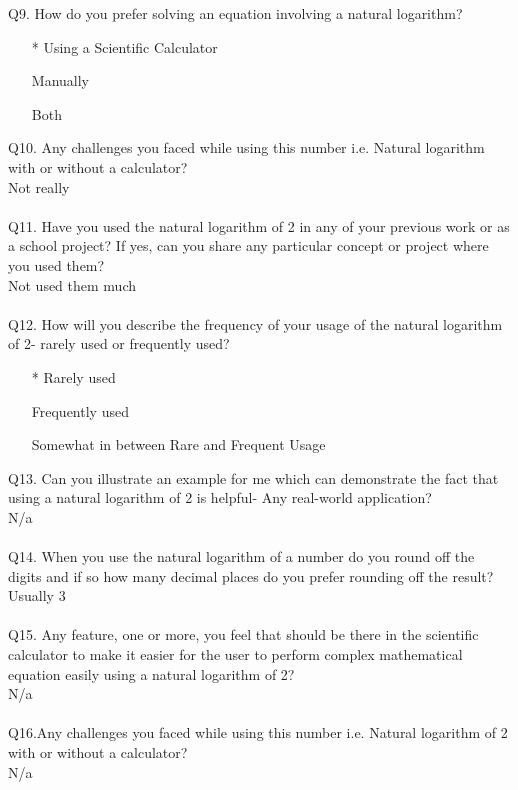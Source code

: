 \documentclass[12pt]{article}
\makeatletter
\newcommand*{\radiobutton}{%
  \@ifstar{\@radiobutton0}{\@radiobutton1}%
}
\newcommand*{\@radiobutton}[1]{%
  \begin{tikzpicture}
    \pgfmathsetlengthmacro\radius{height("X")/2}
    \draw[radius=\radius] circle;
    \ifcase#1 \fill[radius=.6*\radius] circle;\fi
  \end{tikzpicture}%
}
\makeatother
\begin{document}
Q9. How do you prefer solving an equation involving a natural logarithm?
\begin{itemize}
\item[\radiobutton*] Using a Scientific Calculator
\item[\radiobutton] Manually
\item[\radiobutton] Both
\end{itemize}
Q10. Any challenges you faced while using this number i.e. Natural logarithm with or without a calculator?\\
Not really\\\\
Q11. Have you used the natural logarithm of 2 in any of your previous work or as a school project? If yes, can you share any particular concept or project where you used them?\\
Not used them much\\\\
Q12. How will you describe the frequency of your usage of the natural logarithm of 2- rarely used or frequently used?
\begin{itemize}
\item[\radiobutton*] Rarely used
\item[\radiobutton] Frequently used
\item[\radiobutton] Somewhat in between Rare and Frequent Usage
\end{itemize}
Q13. Can you illustrate an example for me which can demonstrate the fact that using a natural logarithm of 2 is helpful- Any real-world application?\\
N/a\\\\
Q14. When you use the natural logarithm of a number do you round off the digits and if so how many decimal places do you prefer rounding off the result? \\
Usually 3\\\\
Q15. Any feature, one or more, you feel that should be there in the scientific calculator to make it easier for the user to perform complex mathematical equation easily using a natural logarithm of 2?\\
N/a\\\\
Q16.Any challenges you faced while using this number i.e. Natural logarithm of 2 with or without a calculator?\\
N/a
\end{document}
